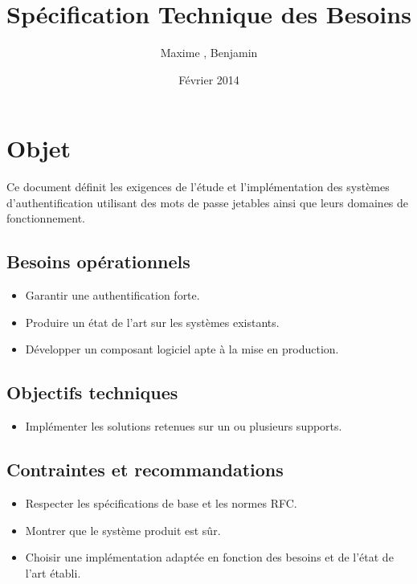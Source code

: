 \documentclass{"../../res/univ-projet"}
\title{Spécification Technique des Besoins}
\author{Maxime \bsc{Michotte}, Benjamin \bsc{Zigh}}
\date{Février 2014}
\begin{document}
\maketitle
\section{Objet}
Ce document définit les exigences de l'étude et l'implémentation des systèmes d'authentification 
utilisant des mots de passe jetables ainsi que leurs domaines de fonctionnement.

    \subsection{Besoins opérationnels} 
        \begin{itemize}
            \item Garantir une authentification forte.
            \item Produire un état de l'art sur les systèmes existants.
            \item Développer un composant logiciel apte à la mise en production.
        \end{itemize}
    \subsection{Objectifs techniques}
    \begin{itemize}	
            \item Implémenter les solutions retenues sur un ou plusieurs supports.
    \end{itemize}
    \subsection{Contraintes et recommandations} 
        \begin{itemize}
            \item Respecter les spécifications de base et les normes RFC.
            \item Montrer que le système produit est sûr.
            \item Choisir une implémentation adaptée en fonction des besoins et de l'état de l'art établi.
        \end{itemize}
\end{document}
